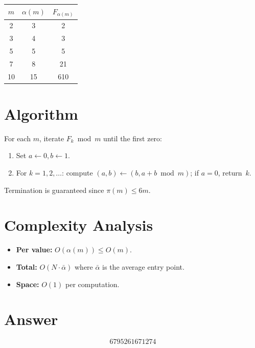 \documentclass[11pt]{article}
\begin{document}
\begin{center}
\begin{tabular}{ccc}
\toprule
$m$ & $\alpha(m)$ & $F_{\alpha(m)}$ \\
\midrule
2  & 3  & 2 \\
3  & 4  & 3 \\
5  & 5  & 5 \\
7  & 8  & 21 \\
10 & 15 & 610 \\
\bottomrule
\end{tabular}
\end{center}

\section{Algorithm}

For each $m$, iterate $F_k \bmod m$ until the first zero:
\begin{enumerate}
\item Set $a \gets 0, b \gets 1$.
\item For $k = 1, 2, \ldots$: compute $(a,b) \gets (b, a+b \bmod m)$; if $a = 0$, return~$k$.
\end{enumerate}
Termination is guaranteed since $\pi(m) \le 6m$.

\section{Complexity Analysis}

\begin{itemize}
\item \textbf{Per value:} $O(\alpha(m)) \le O(m)$.
\item \textbf{Total:} $O(N \cdot \bar\alpha)$ where $\bar\alpha$ is the average entry point.
\item \textbf{Space:} $O(1)$ per computation.
\end{itemize}

\section{Answer}

\[
\boxed{6795261671274}
\]
\end{document}
